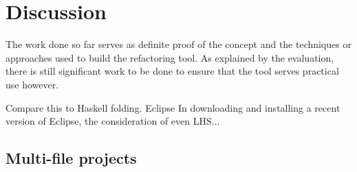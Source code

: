 \chapter{Discussion}\label{C:future}
The work done so far serves as definite proof of the concept and the techniques or approaches used to build the refactoring tool. As explained by the evaluation, there is still significant work to be done to ensure that the tool serves practical use however.


Compare this to Haskell folding. Eclipse In downloading and installing a recent version of Eclipse, the consideration of even LHS... 


\section{Multi-file projects}


